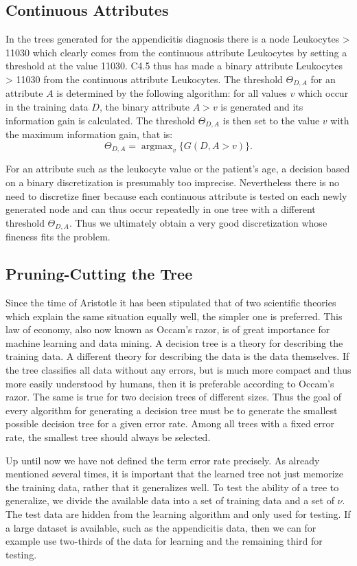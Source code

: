 \documentclass[10pt]{book}
\begin{document}
\subsection{Continuous Attributes}
In the trees generated for the appendicitis diagnosis there is a node Leukocytes > 11030 which clearly comes from the continuous attribute Leukocytes by setting a threshold at the value 11030. C4.5 thus has made a binary attribute Leukocytes > 11030 from the continuous attribute Leukocytes. The threshold $\Theta_{D, A}$ for an attribute $A$ is determined by the following algorithm: for all values $v$ which occur in the training data $D$, the binary attribute $A>v$ is generated and its information gain is calculated. The threshold $\Theta_{D, A}$ is then set to the value $v$ with the maximum information gain, that is:
$$
\Theta_{D, A}=\operatorname{argmax}_{v}\{G(D, A>v)\}.
$$

For an attribute such as the leukocyte value or the patient's age, a decision based on a binary discretization is presumably too imprecise. Nevertheless there is no need to discretize finer because each continuous attribute is tested on each newly generated node and can thus occur repeatedly in one tree with a different threshold $\Theta_{D, A}$. Thus we ultimately obtain a very good discretization whose fineness fits the problem.

\subsection{Pruning-Cutting the Tree}
Since the time of Aristotle it has been stipulated that of two scientific theories which explain the same situation equally well, the simpler one is preferred. This law of economy, also now known as Occam's razor, is of great importance for machine learning and data mining.
A decision tree is a theory for describing the training data. A different theory for describing the data is the data themselves. If the tree classifies all data without any errors, but is much more compact and thus more easily understood by humans, then it is preferable according to Occam's razor. The same is true for two decision trees of different sizes. Thus the goal of every algorithm for generating a decision tree must be to generate the smallest possible decision tree for a given error rate. Among all trees with a fixed error rate, the smallest tree should always be selected.

Up until now we have not defined the term error rate precisely. As already mentioned several times, it is important that the learned tree not just memorize the training data, rather that it generalizes well. To test the ability of a tree to generalize, we divide the available data into a set of training data and a set of $\nu$. The test data are hidden from the learning algorithm and only used for testing. If a large dataset is available, such as the appendicitis data, then we can for example use two-thirds of the data for learning and the remaining third for testing.
\end{document}

